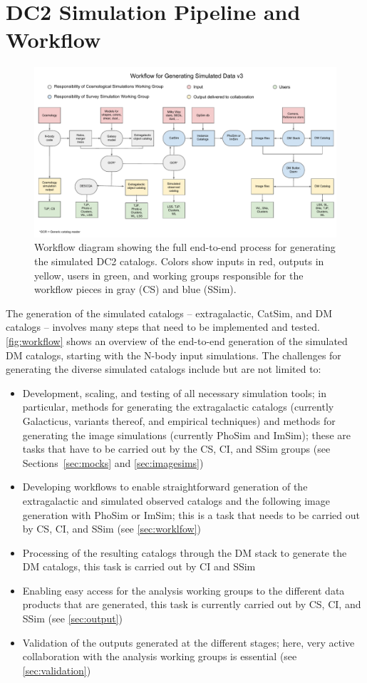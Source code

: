\documentclass[preprint,times]{aastex61}
\begin{document}
\section{DC2 Simulation Pipeline and Workflow}

\begin{figure}[!htb]
\includegraphics[width=1\textwidth]{Catalog_Simulation_Workflow}
\caption{\label{fig:workflow}Workflow diagram showing the full end-to-end process for generating the simulated DC2 catalogs. Colors show inputs in red, outputs in yellow, users in green, and working groups responsible for the workflow pieces in gray (CS) and blue (SSim).}
\end{figure}

The generation of the simulated catalogs -- extragalactic, CatSim, and DM catalogs -- involves many steps that need to be implemented and tested. \autoref{fig:workflow} shows an overview of the end-to-end generation of the simulated DM catalogs, starting with the N-body input simulations. The challenges for generating the diverse simulated catalogs include but are not limited to:
\begin{itemize}
\item Development, scaling, and testing of all necessary simulation tools; in particular, methods for generating the extragalactic catalogs (currently Galacticus, variants thereof, and empirical techniques) and methods for generating the image simulations (currently PhoSim and ImSim); these are tasks that have to be carried out by the CS, CI, and SSim groups (see Sections~\ref{sec:mocks} and \ref{sec:imagesims})
\item Developing workflows to enable straightforward generation of the extragalactic and simulated observed catalogs and the following image generation with PhoSim or ImSim; this is a task that needs to be carried out by CS, CI, and SSim (see \autoref{sec:worklfow})
\item Processing of the resulting catalogs through the DM stack to generate the DM catalogs, this task is carried out by CI and SSim
\item Enabling easy access for the analysis working groups to the different data products that are generated, this task is currently carried out by CS, CI, and SSim (see \autoref{sec:output})
\item Validation of the outputs generated at the different stages; here, very active collaboration with the analysis working groups is essential (see \autoref{sec:validation})
\end{itemize}
\end{document}
